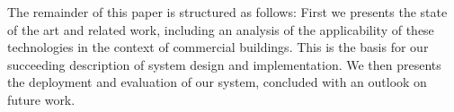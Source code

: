 The remainder of this paper is structured as follows: First we presents the state of the art and related work, including an analysis of the applicability of these technologies in the context of commercial buildings.
This is the basis for our succeeding description of system design and implementation.
We then presents the deployment and evaluation of our system, concluded with an outlook on future work.

%
%
%
